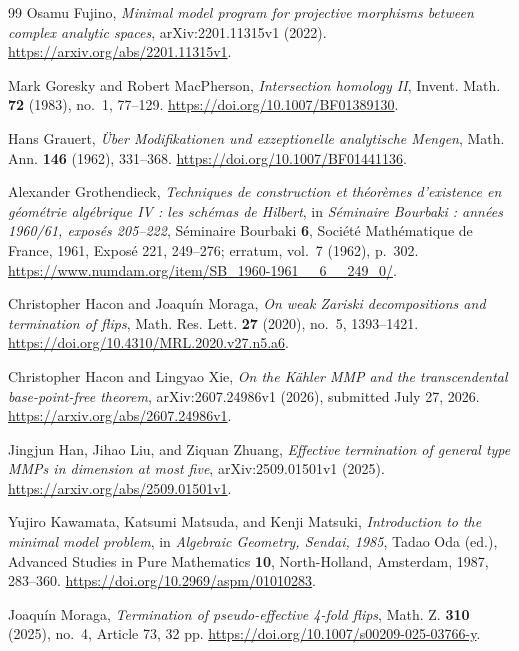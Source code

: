 \begin{thebibliography}{99}
Osamu Fujino,
\emph{Minimal model program for projective morphisms between complex analytic spaces},
arXiv:2201.11315v1 (2022).
\url{https://arxiv.org/abs/2201.11315v1}.

Mark Goresky and Robert MacPherson,
\emph{Intersection homology II},
Invent. Math. \textbf{72} (1983), no.~1, 77--129.
\url{https://doi.org/10.1007/BF01389130}.

Hans Grauert,
\emph{\"Uber Modifikationen und exzeptionelle analytische Mengen},
Math. Ann. \textbf{146} (1962), 331--368.
\url{https://doi.org/10.1007/BF01441136}.

Alexander Grothendieck,
\emph{Techniques de construction et th\'eor\`emes d'existence en g\'eom\'etrie
alg\'ebrique IV : les sch\'emas de Hilbert},
in \emph{S\'eminaire Bourbaki : ann\'ees 1960/61, expos\'es 205--222},
S\'eminaire Bourbaki \textbf{6}, Soci\'et\'e Math\'ematique de France,
1961, Expos\'e 221, 249--276; erratum, vol.~7 (1962), p.~302.
\url{https://www.numdam.org/item/SB_1960-1961__6__249_0/}.

Christopher Hacon and Joaqu\'in Moraga,
\emph{On weak Zariski decompositions and termination of flips},
Math. Res. Lett. \textbf{27} (2020), no.~5, 1393--1421.
\url{https://doi.org/10.4310/MRL.2020.v27.n5.a6}.

Christopher Hacon and Lingyao Xie,
\emph{On the K\"ahler MMP and the transcendental base-point-free theorem},
arXiv:2607.24986v1 (2026), submitted July 27, 2026.
\url{https://arxiv.org/abs/2607.24986v1}.

Jingjun Han, Jihao Liu, and Ziquan Zhuang,
\emph{Effective termination of general type MMPs in dimension at most five},
arXiv:2509.01501v1 (2025).
\url{https://arxiv.org/abs/2509.01501v1}.

Yujiro Kawamata, Katsumi Matsuda, and Kenji Matsuki,
\emph{Introduction to the minimal model problem},
in \emph{Algebraic Geometry, Sendai, 1985}, Tadao Oda (ed.),
Advanced Studies in Pure Mathematics \textbf{10},
North-Holland, Amsterdam, 1987, 283--360.
\url{https://doi.org/10.2969/aspm/01010283}.

Joaqu\'in Moraga,
\emph{Termination of pseudo-effective 4-fold flips},
Math. Z. \textbf{310} (2025), no.~4, Article 73, 32 pp.
\url{https://doi.org/10.1007/s00209-025-03766-y}.


\end{thebibliography}
